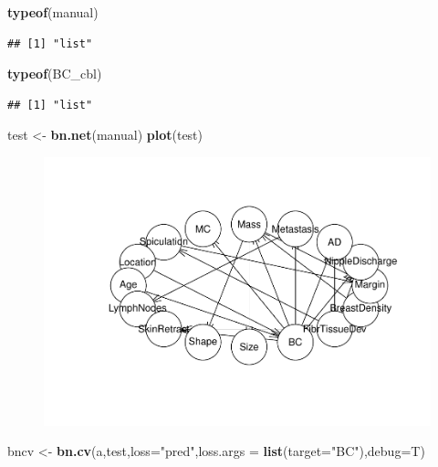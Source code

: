 \documentclass[]{article}
\newenvironment{Shaded}{\begin{snugshade}}{\end{snugshade}}
\newcommand{\KeywordTok}[1]{\textcolor[rgb]{0.13,0.29,0.53}{\textbf{{#1}}}}
\newcommand{\DataTypeTok}[1]{\textcolor[rgb]{0.13,0.29,0.53}{{#1}}}
\newcommand{\StringTok}[1]{\textcolor[rgb]{0.31,0.60,0.02}{{#1}}}
\newcommand{\NormalTok}[1]{{#1}}
\begin{document}
\begin{Shaded}
\begin{Highlighting}[]
\KeywordTok{typeof}\NormalTok{(manual)}
\end{Highlighting}
\end{Shaded}

\begin{verbatim}
## [1] "list"
\end{verbatim}

\begin{Shaded}
\begin{Highlighting}[]
\KeywordTok{typeof}\NormalTok{(BC_cbl)}
\end{Highlighting}
\end{Shaded}

\begin{verbatim}
## [1] "list"
\end{verbatim}

\begin{Shaded}
\begin{Highlighting}[]
\NormalTok{test <-}\StringTok{ }\KeywordTok{bn.net}\NormalTok{(manual)}
\KeywordTok{plot}\NormalTok{(test)}
\end{Highlighting}
\end{Shaded}

\begin{figure}[htbp]
\centering
\includegraphics{BN_Ass2_files/figure-latex/unnamed-chunk-10-1.pdf}
\end{figure}

\begin{Shaded}
\begin{Highlighting}[]
\NormalTok{bncv <-}\StringTok{ }\KeywordTok{bn.cv}\NormalTok{(a,test,}\DataTypeTok{loss=}\StringTok{"pred"}\NormalTok{,}\DataTypeTok{loss.args =} \KeywordTok{list}\NormalTok{(}\DataTypeTok{target=}\StringTok{"BC"}\NormalTok{),}\DataTypeTok{debug=}\NormalTok{T)}
\end{Highlighting}
\end{Shaded}
\end{document}
